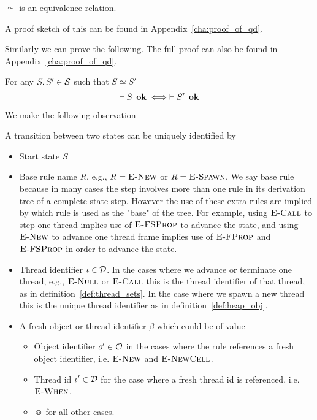 \begin{proposition} \label{prop:eqrel}
  $\simeq$ is an equivalence relation.
\end{proposition}

A proof sketch of this can be found in Appendix~\ref{cha:proof_of_qd}.

Similarly we can prove the following. The full proof can also be found in
Appendix~\ref{cha:proof_of_qd}.
\begin{proposition} \label{prop:eqrel_stateok}
  For any $S, S' \in \mathcal{S}$ such that $S \simeq S'$
  \begin{equation}
    \vdash S \:\: \mbox{\bf ok} \iff \vdash S' \:\: \mbox{\bf ok}
  \end{equation}
\end{proposition}

We make the following observation
\begin{claim}
  A transition between two states can be uniquely identified by
  \begin{itemize}
    \item Start state $S$
    \item Base rule name $R$, e.g., $R = \mbox{{\sc E-New}}$ or $R = \mbox{\sc E-Spawn}$. We say base rule
      because in many cases the step involves more than one rule in its
      derivation tree of a complete state step. However the use of these extra
      rules are implied by which rule is used as the "base" of the tree. For
      example, using $\mbox{\sc E-Call}$ to step one thread implies use of $\mbox{\sc E-FSProp}$ to
      advance the state, and using $\mbox{{\sc E-New}}$ to advance one thread frame implies
      use of $\mbox{\sc E-FProp}$ and $\mbox{\sc E-FSProp}$ in order to advance the state.
    \item Thread identifier $\iota \in \mathcal{D}$. In the cases where we advance or terminate
      one thread, e.g., $\mbox{{\sc E-Null}}$ or $\mbox{\sc E-Call}$ this is the thread identifier of
      that thread, as in definition~\ref{def:thread_sets}. In the case where we
      spawn a new thread this is the unique thread identifier as in
      definition~\ref{def:heap_obj}.
    \item A fresh object or thread identifier $\beta$ which could be of value
      \begin{itemize}
        \item Object identifier $o' \in \mathcal{O}$ in the cases where the rule
          references a fresh object identifier, i.e. $\mbox{{\sc E-New}}$ and $\mbox{{\sc E-NewCell}}$.
        \item Thread id $\iota' \in \mathcal{D}$ for the case where a fresh thread id is
          referenced, i.e. $\mbox{{\sc E-When}}$.
        \item $\smiley$ for all other cases.
      \end{itemize}
  \end{itemize}
\end{claim}

